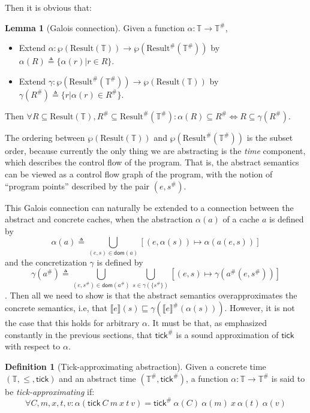 \documentclass[acmsmall,review]{acmart}\settopmatter{printfolios=true,printccs=false,printacmref=false}
\theoremstyle{definition}
\newtheorem{definition}{Definition}[section]
\newtheorem{lem}{Lemma}[section]
\newcommand*{\A}[1]{{#1}^{\#}}
\newcommand*{\Time}{\mathbb{T}}
\newcommand*{\ATime}{\A{\Time}}
\newcommand*{\mem}{m}
\newcommand*{\Result}[1]{\text{Result}({#1})}
\newcommand*{\AResult}[1]{\A{\text{Result}}({#1})}
\newcommand*{\sembracket}[1]{\lBrack{#1}\rBrack}
\newcommand*{\tick}{\mathsf{tick}}
\begin{document}
Then it is obvious that:
\begin{lem}[Galois connection]
  Given a function $\alpha:\Time\rightarrow\ATime$,
  \begin{itemize}
    \item Extend ${\alpha}:\wp(\Result{\Time})\rightarrow\wp(\AResult{\ATime})$ by ${\alpha}(R)\triangleq\{\alpha(r)|r\in R\}$.
    \item Extend ${\gamma}:\wp(\AResult{\ATime})\rightarrow\wp(\Result{\Time})$ by ${\gamma}(\A{R})\triangleq\{r|\alpha(r)\in\A{R}\}$.
  \end{itemize}
  Then $\forall R\subseteq\Result{\Time},\A{R}\subseteq\AResult{\ATime}:{\alpha}(R)\subseteq\A{R}\Leftrightarrow R\subseteq{\gamma}(\A{R})$.
\end{lem}

The ordering between $\wp(\Result{\Time})$ and $\wp(\AResult{\ATime})$ is the subset order, because currently the only thing we are abstracting is the \emph{time} component, which describes the control flow of the program.
That is, the abstract semantics can be viewed as a control flow graph of the program, with the notion of ``program points'' described by the pair $(e,\A{s})$.

This Galois connection can naturally be extended to a connection between the abstract and concrete caches, when the abstraction $\alpha(a)$ of a cache $a$ is defined by
\[\alpha(a)\triangleq\bigcup_{(e,s)\in\mathsf{dom}(a)}[(e,\alpha(s))\mapsto\alpha(a(e,s))]\]
and the concretization $\gamma$ is defined by
\[\gamma(\A{a})\triangleq\bigcup_{(e,\A{s})\in\mathsf{dom}(\A{a})}\bigcup_{s\in\gamma(\{\A{s}\})}[(e,s)\mapsto\gamma(\A{a}(e,\A{s}))]\].
Then all we need to show is that the abstract semantics overapproximates the concrete semantics, i.e, that $\sembracket{e}(s)\sqsubseteq\gamma(\A{\sembracket{e}}(\alpha(s)))$.
However, it is not the case that this holds for arbitrary $\alpha$.
It must be that, as emphasized constantly in the previous sections, that $\A\tick$ is a sound approximation of $\tick$ with respect to $\alpha$.

\begin{definition}[Tick-approximating abstraction]
  Given a concrete time $(\Time,\le,\tick)$ and an abstract time $(\ATime, \A\tick)$, a function $\alpha:\Time\rightarrow\ATime$ is said to be \emph{tick-approximating} if:
  \[
    \forall C,\mem,x,t,v:\alpha(\tick\:C\:\mem\:x\:t\:v)=\A\tick\:\alpha(C)\:\alpha(\mem)\:x\:\alpha(t)\:\alpha(v)
  \]
\end{definition}
\end{document}
